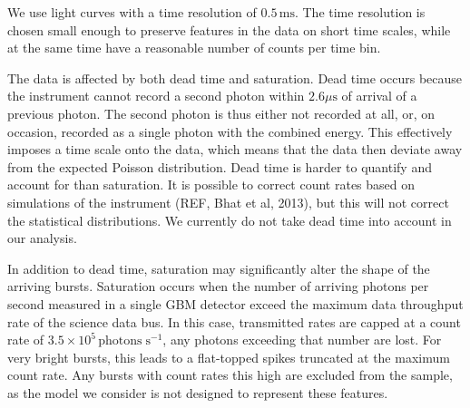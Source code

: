 \documentclass[12pt]{emulateapj}
\newcommand{\counts}{y}
\begin{document}
We use light curves with a time resolution of $0.5\,\mathrm{ms}$. The time resolution is chosen small enough to preserve features
in the data on short time scales, while at the same time have a reasonable number of counts per time bin. 

The data is affected by both dead time and saturation. 
Dead time occurs because the instrument cannot record a second photon within $2.6\mu\mathrm{s}$ of arrival of a previous photon. 
The second photon is thus either not recorded at all, or, on occasion, recorded as a single photon with the combined energy. This effectively 
imposes a time scale onto the data, which means that the data then deviate away from the expected Poisson distribution. 
Dead time is harder to quantify and account for than saturation. It is possible to correct count rates based on simulations of the instrument (REF, Bhat et al, 2013),
but this will not correct the statistical distributions. We currently do not take dead time into account in our analysis. 

In addition to dead time, saturation may significantly alter the shape of the arriving bursts. Saturation occurs when the number of arriving photons per second
measured in a single GBM detector exceed the maximum data throughput rate of the science data bus. In this case, transmitted rates are capped at a 
count rate of $3.5 \times 10^{5} \, \mathrm{photons} \; \mathrm{s}^{-1}$, any photons exceeding that number are lost. For very bright bursts, this leads
to a flat-topped spikes truncated at the maximum count rate. Any bursts with count rates this high are excluded from the sample, as the model we
consider is not designed to represent these features. 


\end{document}
